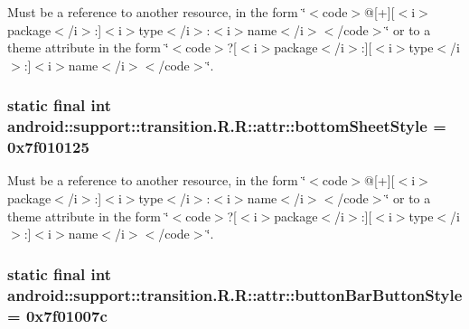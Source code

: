 Must be a reference to another resource, in the form \char`\"{}$<$code$>$@\mbox{[}+\mbox{]}\mbox{[}$<$i$>$package$<$/i$>$:\mbox{]}$<$i$>$type$<$/i$>$:$<$i$>$name$<$/i$>$$<$/code$>$\char`\"{} or to a theme attribute in the form \char`\"{}$<$code$>$?\mbox{[}$<$i$>$package$<$/i$>$:\mbox{]}\mbox{[}$<$i$>$type$<$/i$>$:\mbox{]}$<$i$>$name$<$/i$>$$<$/code$>$\char`\"{}. \hypertarget{classandroid_1_1support_1_1transition_1_1_r_1_1attr_4eb1fe56cb93d2ffb37f55698d849e76}{
\subsubsection[{bottomSheetStyle}]{\setlength{\rightskip}{0pt plus 5cm}static final int android::support::transition.R.R::attr::bottomSheetStyle = 0x7f010125}}
\label{classandroid_1_1support_1_1transition_1_1_r_1_1attr_4eb1fe56cb93d2ffb37f55698d849e76}


Must be a reference to another resource, in the form \char`\"{}$<$code$>$@\mbox{[}+\mbox{]}\mbox{[}$<$i$>$package$<$/i$>$:\mbox{]}$<$i$>$type$<$/i$>$:$<$i$>$name$<$/i$>$$<$/code$>$\char`\"{} or to a theme attribute in the form \char`\"{}$<$code$>$?\mbox{[}$<$i$>$package$<$/i$>$:\mbox{]}\mbox{[}$<$i$>$type$<$/i$>$:\mbox{]}$<$i$>$name$<$/i$>$$<$/code$>$\char`\"{}. \hypertarget{classandroid_1_1support_1_1transition_1_1_r_1_1attr_8fe3228dfd4dfeb406a2a612ce3b480a}{
\subsubsection[{buttonBarButtonStyle}]{\setlength{\rightskip}{0pt plus 5cm}static final int android::support::transition.R.R::attr::buttonBarButtonStyle = 0x7f01007c}}
\label{classandroid_1_1support_1_1transition_1_1_r_1_1attr_8fe3228dfd4dfeb406a2a612ce3b480a}


